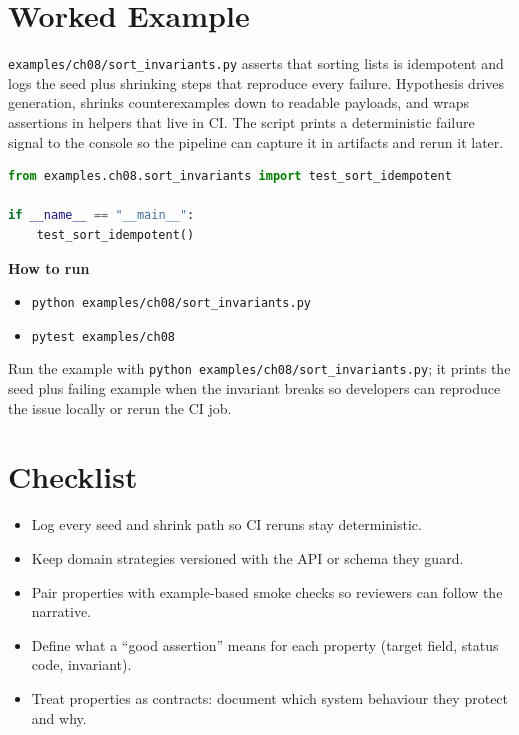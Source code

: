 \section{Worked Example}
\texttt{examples/ch08/sort\_invariants.py} asserts that sorting lists is idempotent and logs the seed plus shrinking steps that reproduce every failure. Hypothesis drives generation, shrinks counterexamples down to readable payloads, and wraps assertions in helpers that live in CI. The script prints a deterministic failure signal to the console so the pipeline can capture it in artifacts and rerun it later.

\begin{lstlisting}[language=python, caption={Hypothesis sort invariant guard.}, label=lst:ch08-sort-invariants]
from examples.ch08.sort_invariants import test_sort_idempotent

if __name__ == "__main__":
    test_sort_idempotent()
\end{lstlisting}

\textbf{How to run}
\begin{itemize}
  \item \texttt{python examples/ch08/sort\_invariants.py}
  \item \texttt{pytest examples/ch08}
\end{itemize}

Run the example with \texttt{python examples/ch08/sort\_invariants.py}; it prints the seed plus failing example when the invariant breaks so developers can reproduce the issue locally or rerun the CI job.

\section{Checklist}
\begin{itemize}
  \item Log every seed and shrink path so CI reruns stay deterministic.
  \item Keep domain strategies versioned with the API or schema they guard.
  \item Pair properties with example-based smoke checks so reviewers can follow the narrative.
  \item Define what a “good assertion” means for each property (target field, status code, invariant).
  \item Treat properties as contracts: document which system behaviour they protect and why.
\end{itemize}

